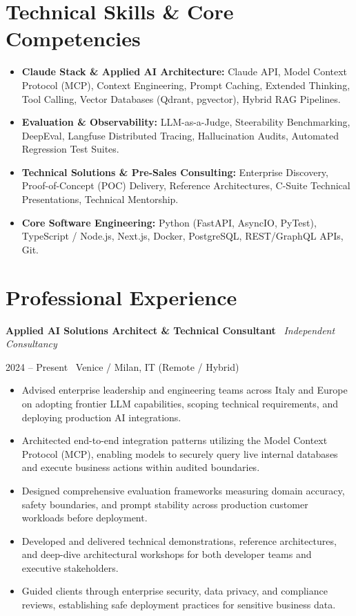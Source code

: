\documentclass[a4paper,10pt]{article}
\newcommand{\role}[4]{%
  \vspace{2pt}\noindent
  \begin{minipage}[t]{0.70\textwidth}\raggedright\textbf{#1} \textbullet\ \textit{#3}\end{minipage}%
  \hfill
  \begin{minipage}[t]{0.28\textwidth}\raggedleft\footnotesize\color{gray}#2 \textbullet\ #4\end{minipage}%
  \vspace{1pt}%
}
\begin{document}
\section{Technical Skills \& Core Competencies}
\begin{itemize}[leftmargin=1.2em, itemsep=2pt]
  \item \textbf{Claude Stack \& Applied AI Architecture:} Claude API, Model Context Protocol (MCP), Context Engineering, Prompt Caching, Extended Thinking, Tool Calling, Vector Databases (Qdrant, pgvector), Hybrid RAG Pipelines.
  \item \textbf{Evaluation \& Observability:} LLM-as-a-Judge, Steerability Benchmarking, DeepEval, Langfuse Distributed Tracing, Hallucination Audits, Automated Regression Test Suites.
  \item \textbf{Technical Solutions \& Pre-Sales Consulting:} Enterprise Discovery, Proof-of-Concept (POC) Delivery, Reference Architectures, C-Suite Technical Presentations, Technical Mentorship.
  \item \textbf{Core Software Engineering:} Python (FastAPI, AsyncIO, PyTest), TypeScript / Node.js, Next.js, Docker, PostgreSQL, REST/GraphQL APIs, Git.
\end{itemize}

\section{Professional Experience}

\role{Applied AI Solutions Architect \& Technical Consultant}{2024 -- Present}{Independent Consultancy}{Venice / Milan, IT (Remote / Hybrid)}
\begin{itemize}
  \item Advised enterprise leadership and engineering teams across Italy and Europe on adopting frontier LLM capabilities, scoping technical requirements, and deploying production AI integrations.
  \item Architected end-to-end integration patterns utilizing the Model Context Protocol (MCP), enabling models to securely query live internal databases and execute business actions within audited boundaries.
  \item Designed comprehensive evaluation frameworks measuring domain accuracy, safety boundaries, and prompt stability across production customer workloads before deployment.
  \item Developed and delivered technical demonstrations, reference architectures, and deep-dive architectural workshops for both developer teams and executive stakeholders.
  \item Guided clients through enterprise security, data privacy, and compliance reviews, establishing safe deployment practices for sensitive business data.
\end{itemize}
\end{document}
